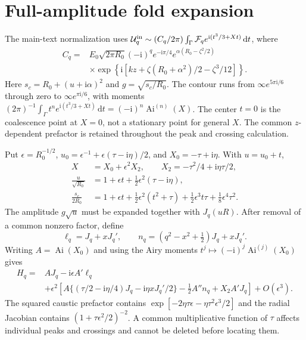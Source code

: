 \documentclass[11pt,a4paper]{article}
\newcommand{\ii}{\mathrm{i}}
\newcommand{\Ai}{\operatorname{Ai}}
\begin{document}
\section{Full-amplitude fold expansion}
The main-text normalization uses
$\mathcal U_q^{\rm in}\sim(C_q/2\pi)\int_\Gamma\mathcal F_q e^{\ii(t^3/3+Xt)}\,\mathrm{d}t$,
where
\[
\begin{aligned}
C_q={}&E_0\sqrt{2\pi R_0}(-\ii)^q e^{-\ii\pi/4}
e^{\alpha(R_0-\zeta^2/2)}\\
&\times\exp\!\left\{\ii\left[kz+\zeta(R_0+\alpha^2)/2-\zeta^3/12\right]\right\}.
\end{aligned}
\]
Here $s_c=R_0+(u+\ii\alpha)^2$ and $g=\sqrt{s_c/R_0}$.
The contour runs from $\infty e^{5\pi\ii/6}$ through zero to
$\infty e^{\pi\ii/6}$, with moments
$(2\pi)^{-1}\int_\Gamma t^n e^{\ii(t^3/3+Xt)}\,\mathrm{d}t=(-\ii)^n\Ai^{(n)}(X)$.
The center $t=0$ is the coalescence point at $X=0$, not a stationary point
for general $X$. The common $z$-dependent prefactor is retained throughout
the peak and crossing calculation.

Put $\epsilon=R_0^{-1/2}$, $u_0=\epsilon^{-1}+\epsilon(\tau-\ii\eta)/2$,
and $X_0=-\tau+\ii\eta$. With $u=u_0+t$,
\begin{align}
X&=X_0+\epsilon^2X_2,\qquad X_2=-\tau^2/4+\ii\eta\tau/2,\\
\frac{u}{\sqrt{R_0}}&=1+\epsilon t+\tfrac12\epsilon^2(\tau-\ii\eta),\\
\frac{s_c}{2R_0}&=1+\epsilon t+\tfrac12\epsilon^2(t^2+\tau)
+\tfrac12\epsilon^3t\tau+\tfrac18\epsilon^4\tau^2.
\end{align}
The amplitude $g\sqrt u$ must be expanded together with $J_q(uR)$.
After removal of a common nonzero factor, define
\begin{equation}
\ell_q=J_q+xJ_q',\qquad
n_q=(q^2-x^2+\tfrac12)J_q+xJ_q'.
\end{equation}
Writing $A=\Ai(X_0)$ and using the Airy moments
$t^j\mapsto(-\ii)^j\Ai^{(j)}(X_0)$ gives
\begin{align}
H_q={}&AJ_q-\ii\epsilon A'\ell_q\\
&+\epsilon^2\left[
A\{(\tau/2-\ii\eta/4)J_q-\ii\eta xJ_q'/2\}
-\tfrac12 A''n_q+X_2 A'J_q\right]+O(\epsilon^3).
\end{align}
The squared caustic prefactor contains
$\exp[-2\eta\tau\epsilon-\eta\tau^2\epsilon^3/2]$ and the radial
Jacobian contains $(1+\tau\epsilon^2/2)^{-2}$. A common multiplicative
function of $\tau$ affects individual peaks and crossings and cannot be
deleted before locating them.
\end{document}
